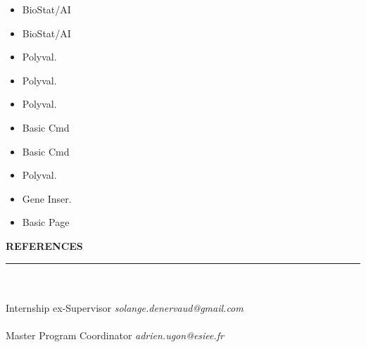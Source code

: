 \documentclass[9pt,a4paper]{article}
\newcommand{\myline}[1]{\rule{#1}{1.0pt}\\}
\newcommand{\topic}[1]{\textbf{\Large\selectfont\MakeUppercase{#1}}\\\vspace{-1em}\myline{1.0cm}}
\newcommand{\subtopic}[1]{\textbf{\normalsize\selectfont{#1}}\\}
\begin{document}
\begin{minipage}[c]{0.3\linewidth}
\begin{flushleft}
\begin{minipage}[c]{0.35\linewidth}
\begin{itemize}[label={},leftmargin=*]
            \item BioStat/AI
            \item BioStat/AI
            \item Polyval.
            \item Polyval.
            \item Polyval.
            \item Basic Cmd
            \item Basic Cmd
            \item Polyval.
            \item Gene Inser.
            \item Basic Page
        \end{itemize}
    \end{minipage}
    \vspace{0.1em} 


\vspace{1.5em}
\topic{References}
\subtopic{Solange DENERVAUD}
Internship ex-Supervisor
\textit{solange.denervaud@gmail.com}\\
\subtopic{Adrien UGON}
Master Program Coordinator
\textit{adrien.ugon@esiee.fr}
\end{flushleft}
\end{minipage} %
\end{document}
